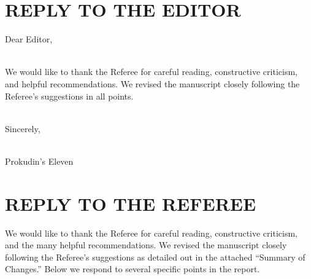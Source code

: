 \documentclass[a4paper,11pt]{article}
\begin{document}
\section*{REPLY TO THE EDITOR}

Dear Editor,

\ \\
We would like to thank the Referee for careful reading, 
constructive criticism, and helpful recommendations. We 
revised the manuscript closely following the Referee's
suggestions in all points.

\ \\
Sincerely,

\ \\
Prokudin's Eleven \\


\section*{REPLY TO THE REFEREE}

We would like to thank the Referee for careful reading, 
constructive criticism, and the many helpful recommendations. 
We revised the manuscript closely following the Referee's
suggestions  as detailed out in the attached ``Summary of Changes.''
Below we respond to several specific points in the report.
\end{document}
